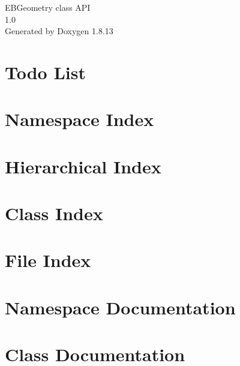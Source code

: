 \documentclass[twoside]{book}
\newcommand{\+}{\discretionary{\mbox{\scriptsize$\hookleftarrow$}}{}{}}
\newcommand{\clearemptydoublepage}{%
  \newpage{\pagestyle{empty}\cleardoublepage}%
}
\begin{document}
\hypersetup{pageanchor=false,
             bookmarksnumbered=true,
             pdfencoding=unicode
            }
\begin{titlepage}
\vspace*{7cm}
\begin{center}%
{\Large E\+B\+Geometry class A\+PI \\[1ex]\large 1.\+0 }\\
\vspace*{1cm}
{\large Generated by Doxygen 1.8.13}\\
\end{center}
\end{titlepage}
\clearemptydoublepage
{}
\tableofcontents
\clearemptydoublepage
{}
\hypersetup{pageanchor=true}

\chapter{Todo List}
\label{todo}

\chapter{Namespace Index}

\chapter{Hierarchical Index}

\chapter{Class Index}

\chapter{File Index}

\chapter{Namespace Documentation}




\chapter{Class Documentation}






















\end{document}
